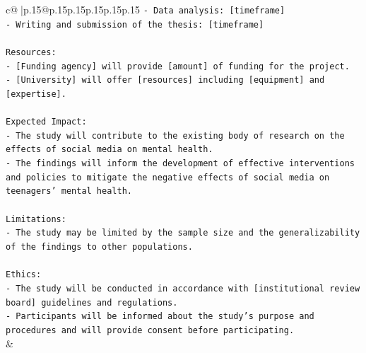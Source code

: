 \documentclass{article}
\begin{document}
{\begin{supertabular}{c@{$\;$}|p{.15\linewidth}@{}p{.15\linewidth}p{.15\linewidth}p{.15\linewidth}p{.15\linewidth}p{.15\linewidth}}
{{{\texttt{{-} Data analysis: {[}timeframe{]}} \\
\texttt{{-} Writing and submission of the thesis: {[}timeframe{]}} \\
\\ 
\texttt{Resources:} \\
\texttt{{-} {[}Funding agency{]} will provide {[}amount{]} of funding for the project.} \\
\texttt{{-} {[}University{]} will offer {[}resources{]} including {[}equipment{]} and {[}expertise{]}.} \\
\\ 
\texttt{Expected Impact:} \\
\texttt{{-} The study will contribute to the existing body of research on the effects of social media on mental health.} \\
\texttt{{-} The findings will inform the development of effective interventions and policies to mitigate the negative effects of social media on teenagers' mental health.} \\
\\ 
\texttt{Limitations:} \\
\texttt{{-} The study may be limited by the sample size and the generalizability of the findings to other populations.} \\
\\ 
\texttt{Ethics:} \\
\texttt{{-} The study will be conducted in accordance with {[}institutional review board{]} guidelines and regulations.} \\
\texttt{{-} Participants will be informed about the study's purpose and procedures and will provide consent before participating.} \\
            }
        }
    }
    & \\ \\


\end{supertabular}}
\end{document}
